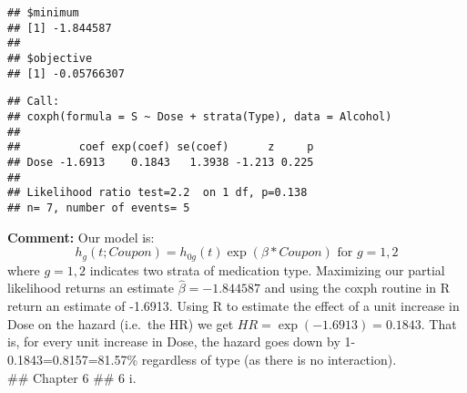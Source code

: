 \documentclass[
]{article}
\newenvironment{Shaded}{\begin{snugshade}}{\end{snugshade}}
\newcommand{\AttributeTok}[1]{\textcolor[rgb]{0.77,0.63,0.00}{#1}}
\newcommand{\DecValTok}[1]{\textcolor[rgb]{0.00,0.00,0.81}{#1}}
\newcommand{\FloatTok}[1]{\textcolor[rgb]{0.00,0.00,0.81}{#1}}
\newcommand{\FunctionTok}[1]{\textcolor[rgb]{0.00,0.00,0.00}{#1}}
\newcommand{\NormalTok}[1]{#1}
\newcommand{\OtherTok}[1]{\textcolor[rgb]{0.56,0.35,0.01}{#1}}
\newcommand{\SpecialCharTok}[1]{\textcolor[rgb]{0.00,0.00,0.00}{#1}}
\begin{document}
\begin{verbatim}
## $minimum
## [1] -1.844587
## 
## $objective
## [1] -0.05766307
\end{verbatim}

\begin{Shaded}
\end{Shaded}

\begin{verbatim}
## Call:
## coxph(formula = S ~ Dose + strata(Type), data = Alcohol)
## 
##         coef exp(coef) se(coef)      z     p
## Dose -1.6913    0.1843   1.3938 -1.213 0.225
## 
## Likelihood ratio test=2.2  on 1 df, p=0.138
## n= 7, number of events= 5
\end{verbatim}

\textbf{Comment:} Our model is: \[
h_g(t;Coupon) = h_{0g}(t)\exp(\beta * Coupon) \text{ for } g=1,2
\] where \(g=1,2\) indicates two strata of medication type. Maximizing
our partial likelihood returns an estimate \(\hat{\beta}=-1.844587\) and
using the coxph routine in R return an estimate of -1.6913. Using R to
estimate the effect of a unit increase in Dose on the hazard (i.e.~the
HR) we get \(\hat{HR}=\exp(-1.6913)=0.1843\). That is, for every unit
increase in Dose, the hazard goes down by 1-0.1843=0.8157=81.57\%
regardless of type (as there is no interaction).\\
\#\# Chapter 6 \#\# 6 i.
\end{document}
